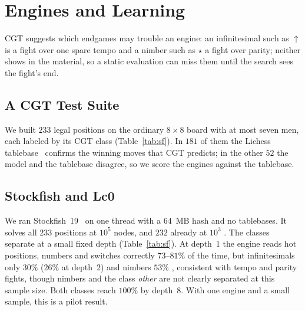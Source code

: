 \section{Engines and Learning}\label{sec:engines}

CGT suggests which endgames may trouble an engine: an infinitesimal such as ${\uparrow}$ is a fight over one
spare tempo and a nimber such as $\star$ a fight over parity; neither shows in the material, so a static
evaluation can miss them until the search sees the fight's end.

\subsection{A CGT Test Suite}

We built $233$ legal positions on the ordinary $8\times8$ board with at most seven men, each labeled by its CGT class
(Table~\ref{tab:sf}). In $181$ of them the Lichess tablebase~\cite{LichessTB} confirms the winning moves that
CGT predicts; in the other $52$ the model and the tablebase disagree, so we score the engines against the
tablebase.

\subsection{Stockfish and Lc0}

We ran Stockfish~19~\cite{Stockfish} on one thread with a $64$~MB hash and no tablebases. It solves all $233$
positions at $10^5$ nodes, and $232$ already at $10^3$ . The classes separate at a small fixed depth
(Table~\ref{tab:sf}). At depth~1 the engine reads hot positions, numbers and switches correctly
$73$--$81\%$ of the time, but infinitesimals only $30\%$ ($26\%$ at depth~2) and nimbers $53\%$
, consistent with tempo and parity fights, though nimbers and the class \emph{other} are not clearly
separated at this sample size. Both classes reach $100\%$ by depth~8.
With one engine and a small sample, this is a pilot result.

